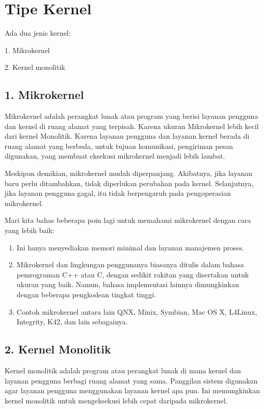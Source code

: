 \documentclass{report}
\begin{document}
	\vskip0.5cm

	\section*{Tipe Kernel}
	
	Ada dua jenis kernel:
	
	1. Mikrokernel
	
	2. Kernel monolitik
	
	\vskip0.5cm
	
	\subsection*{1. Mikrokernel}
	
	Mikrokernel adalah perangkat lunak atau program yang berisi layanan pengguna dan kernel di ruang alamat yang terpisah. Karena ukuran Mikrokernel lebih kecil dari kernel Monolitik. Karena layanan pengguna dan layanan kernel berada di ruang alamat yang berbeda, untuk tujuan komunikasi, pengiriman pesan digunakan, yang membuat eksekusi mikrokernel menjadi lebih lambat.
	
	Meskipun demikian, mikrokernel mudah diperpanjang. Akibatnya, jika layanan baru perlu ditambahkan, tidak diperlukan perubahan pada kernel. Selanjutnya, jika layanan pengguna gagal, itu tidak berpengaruh pada pengoperasian mikrokernel.
	
	Mari kita bahas beberapa poin lagi untuk memahami mikrokernel dengan cara yang lebih baik: 
	
	\begin{enumerate}
		\item Ini hanya menyediakan memori minimal dan layanan manajemen proses.
		
		\item Mikrokernel dan lingkungan penggunanya biasanya ditulis dalam bahasa pemrograman C++ atau C, dengan sedikit rakitan yang disertakan untuk ukuran yang baik. Namun, bahasa implementasi lainnya dimungkinkan dengan beberapa pengkodean tingkat tinggi.
		
		\item Contoh mikrokernel antara lain QNX, Minix, Symbian, Mac OS X, L4Linux, Integrity, K42, dan lain sebagainya.
	\end{enumerate}

	\vskip0.5cm
	
	\subsection*{2. Kernel Monolitik}
	Kernel monolitik adalah program atau perangkat lunak di mana kernel dan layanan pengguna berbagi ruang alamat yang sama. Panggilan sistem digunakan agar layanan pengguna menggunakan layanan kernel apa pun. Ini memungkinkan kernel monolitik untuk mengeksekusi lebih cepat daripada mikrokernel.
	
\end{document}
